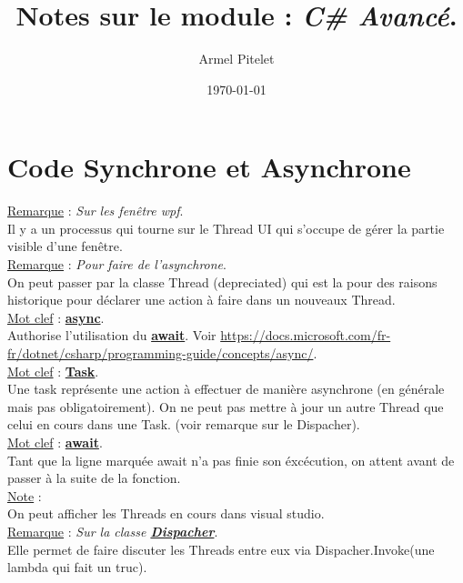 \documentclass[a4paper,12pt,twoside]{article}
\title{Notes sur le module : \textit{C\# Avancé}.}
\author{Armel Pitelet}
\date{\today}
\newcommand{\urlcolor}{magenta}  %
\newcommand{\keycolor}{purple} %
\newcommand{\incode}[1]{{\footnotesize\ttfamily #1}} %
\newcommand{\rem}[2]{\noindent\underline{Remarque} : \textit{#1}.\\ \indent #2}
\newcommand{\note}[1]{\noindent\underline{Note} : \\ \indent #1}
\newcommand{\keyref}[2]{\hypersetup{urlcolor=\keycolor} \href{#1}{\textbf{#2}}\hypersetup{urlcolor=\urlcolor}}
\newcommand{\keyword}[3]{\noindent\underline{Mot clef} : \keyref{#1}{#2}. \\ \indent #3}
\begin{document}
\maketitle
\tableofcontents

\section{Code Synchrone et Asynchrone}

\rem{Sur les fenêtre wpf}{Il y a un processus qui tourne sur le Thread UI qui s'occupe de gérer la partie visible d'une fenêtre.}\\

\rem{Pour faire de l'asynchrone}{On peut passer par la classe Thread (depreciated) qui est la pour des raisons historique pour déclarer une action à faire dans un nouveaux Thread.}\\

\keyword{https://docs.microsoft.com/fr-fr/dotnet/csharp/language-reference/keywords/async}{async}{Authorise l'utilisation du \keyref{https://docs.microsoft.com/fr-fr/dotnet/csharp/language-reference/operators/await}{await}. Voir \url{https://docs.microsoft.com/fr-fr/dotnet/csharp/programming-guide/concepts/async/}.}\\

\keyword{https://docs.microsoft.com/fr-fr/dotnet/api/system.threading.tasks.task?view=net-6.0}{Task}{Une task représente une action à effectuer de manière asynchrone (en générale mais pas obligatoirement). On ne peut pas mettre à jour un autre Thread que celui en cours dans une Task. (voir remarque sur le \incode{Dispacher}).}\\

\keyword{https://docs.microsoft.com/fr-fr/dotnet/csharp/language-reference/operators/await}{await}{Tant que la ligne marquée await n'a pas finie son éxcécution, on attent avant de passer à la suite de la fonction.}\\

\note{On peut afficher les Threads en cours dans visual studio.}\\

\rem{Sur la classe \keyref{https://docs.microsoft.com/fr-fr/dotnet/api/system.windows.threading.dispatcher?view=windowsdesktop-6.0}{Dispacher}}{Elle permet de faire discuter les Threads entre eux via \incode{Dispacher.Invoke(une lambda qui fait un truc)}.}\\
\end{document}
